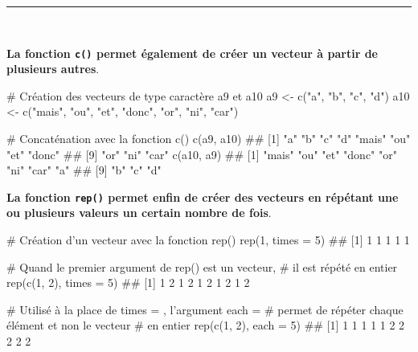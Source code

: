 \documentclass[12pt,twosided, notitlepage]{book}
\newenvironment{Shaded}{}{}
\newcommand{\CommentTok}[1]{\textcolor[rgb]{0.00,0.50,0.00}{#1}}
\newcommand{\DataTypeTok}[1]{#1}
\newcommand{\DecValTok}[1]{#1}
\newcommand{\KeywordTok}[1]{\textcolor[rgb]{0.00,0.00,1.00}{#1}}
\newcommand{\NormalTok}[1]{#1}
\newcommand{\StringTok}[1]{\textcolor[rgb]{0.00,0.50,0.50}{#1}}
\renewenvironment{Shaded}{\begin{snugshade}}{\end{snugshade}}
\begin{document}
\begin{center}\rule{0.5\linewidth}{\linethickness}\end{center}

~

\textbf{La fonction \texttt{c()} permet également de créer un vecteur à
partir de plusieurs autres}.

\begin{Shaded}
\begin{Highlighting}[]
\CommentTok{# Création des vecteurs de type caractère a9 et a10}
\NormalTok{a9 <-}\StringTok{ }\KeywordTok{c}\NormalTok{(}\StringTok{"a"}\NormalTok{, }\StringTok{"b"}\NormalTok{, }\StringTok{"c"}\NormalTok{, }\StringTok{"d"}\NormalTok{)}
\NormalTok{a10 <-}\StringTok{ }\KeywordTok{c}\NormalTok{(}\StringTok{"mais"}\NormalTok{, }\StringTok{"ou"}\NormalTok{, }\StringTok{"et"}\NormalTok{, }\StringTok{"donc"}\NormalTok{, }\StringTok{"or"}\NormalTok{, }\StringTok{"ni"}\NormalTok{, }\StringTok{"car"}\NormalTok{)}

\CommentTok{# Concaténation avec la fonction c()}
\KeywordTok{c}\NormalTok{(a9, a10)}
\NormalTok{  ##  [1] "a"    "b"    "c"    "d"    "mais" "ou"   "et"   "donc"}
\NormalTok{  ##  [9] "or"   "ni"   "car"}
\KeywordTok{c}\NormalTok{(a10, a9)}
\NormalTok{  ##  [1] "mais" "ou"   "et"   "donc" "or"   "ni"   "car"  "a"   }
\NormalTok{  ##  [9] "b"    "c"    "d"}
\end{Highlighting}
\end{Shaded}

\textbf{La fonction \texttt{rep()} permet enfin de créer des vecteurs en
répétant une ou plusieurs valeurs un certain nombre de
fois}.

\begin{Shaded}
\begin{Highlighting}[]
\CommentTok{# Création d'un vecteur avec la fonction rep()}
\KeywordTok{rep}\NormalTok{(}\DecValTok{1}\NormalTok{, }\DataTypeTok{times =} \DecValTok{5}\NormalTok{)}
\NormalTok{  ## [1] 1 1 1 1 1}

\CommentTok{# Quand le premier argument de rep() est un vecteur, }
\CommentTok{# il est répété en entier}
\KeywordTok{rep}\NormalTok{(}\KeywordTok{c}\NormalTok{(}\DecValTok{1}\NormalTok{, }\DecValTok{2}\NormalTok{), }\DataTypeTok{times =} \DecValTok{5}\NormalTok{)}
\NormalTok{  ##  [1] 1 2 1 2 1 2 1 2 1 2}

\CommentTok{# Utilisé à la place de times = , l'argument each = }
\CommentTok{# permet de répéter chaque élément et non le vecteur}
\CommentTok{# en entier}
\KeywordTok{rep}\NormalTok{(}\KeywordTok{c}\NormalTok{(}\DecValTok{1}\NormalTok{, }\DecValTok{2}\NormalTok{), }\DataTypeTok{each =} \DecValTok{5}\NormalTok{)}
\NormalTok{  ##  [1] 1 1 1 1 1 2 2 2 2 2}
\end{Highlighting}
\end{Shaded}
\end{document}
